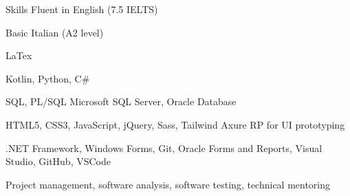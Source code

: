 
\begin{rubric}{Skills}
\entry*[Languages]
	Fluent in English (7.5 IELTS)
    
    Basic Italian (A2 level)

\entry*[Research]
    LaTex

	Kotlin, Python, C\#

\entry*[Databases]
    SQL, PL/SQL
	Microsoft SQL Server, Oracle Database

	HTML5, CSS3, JavaScript, jQuery, Sass, Tailwind
    Axure RP for UI prototyping

	.NET Framework, Windows Forms, Git, Oracle Forms and Reports, Visual Studio, GitHub, VSCode

\entry*[Misc.]
	Project management, software analysis, software testing, technical mentoring

\end{rubric}

